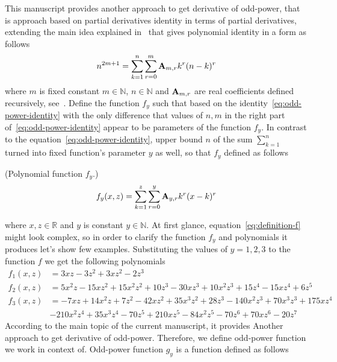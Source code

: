 This manuscript provides another approach to get derivative of odd-power, that is approach based
on partial derivatives identity in terms of partial derivatives, extending the main idea explained in~\cite{kolosov_2022}
that gives polynomial identity in a form as follows
\begin{equation}
    n^{2m+1} = \sum_{k=1}^{n} \sum_{r=0}^{m} {\mathbf{A}} \sb{m,r} k^r (n-k)^r
    \label{eq:odd-power-identity}
\end{equation}
where $m$ is fixed constant $m\in\mathbb{N}$, $n \in \mathbb{N}$ and ${\mathbf{A}} \sb{m,r}$ are real coefficients defined
recursively, see~\cite{kolosov2016link}.
Define the function $f_{y}$ such that based on the identity~\eqref{eq:odd-power-identity} with the only difference that
values of $n, m$ in the right part of~\eqref{eq:odd-power-identity} appear to be parameters of the function $f_{y}$.
In contrast to the equation~\eqref{eq:odd-power-identity}, upper bound $n$ of the sum $\sum_{k=1}^{n}$ turned into fixed
function's parameter $y$ as well, so that $f_{y}$ defined as follows
\begin{definition} (Polynomial function $f_{y}$.)
    \begin{equation}
        f_{y} (x, z) = \sum_{k=1}^{z} \sum_{r=0}^{y} {\mathbf{A}} \sb{y,r} k^r (x-k)^r
        \label{eq:definition-f}
    \end{equation}
\end{definition}
where $x, z\in \mathbb{R}$ and $y$ is constant $y \in \mathbb{N}$.
At first glance, equation~\eqref{eq:definition-f} might look complex, so in order to clarify
the function $f_y$ and polynomials it produces let's show few examples.
Substituting the values of $y=1,2,3$ to the function $f$ we get the following polynomials
\begin{align*}
    f_{1} (x, z) &= 3 x z - 3 z^2 + 3 x z^2 - 2 z^3 \\
    f_{2} (x, z) &= 5 x^2 z - 15 x z^2 + 15 x^2 z^2 + 10 z^3 - 30 x z^3 + 10 x^2 z^3 +
    15 z^4 - 15 x z^4 + 6 z^5 \\
    f_{3} (x, z) &= -7 x z + 14 x^2 z + 7 z^2 - 42 x z^2 + 35 x^3 z^2 + 28 z^3 - 140 x^2 z^3 + 70 x^3 z^3 + 175 x z^4 \\
    &- 210 x^2 z^4 + 35 x^3 z^4 - 70 z^5 + 210 x z^5 - 84 x^2 z^5 - 70 z^6 + 70 x z^6 - 20 z^7
\end{align*}
According to the main topic of the current manuscript, it provides Another approach to get derivative of odd-power.
Therefore, we define odd-power function we work in context of.
Odd-power function $g_y$ is a function defined as follows
